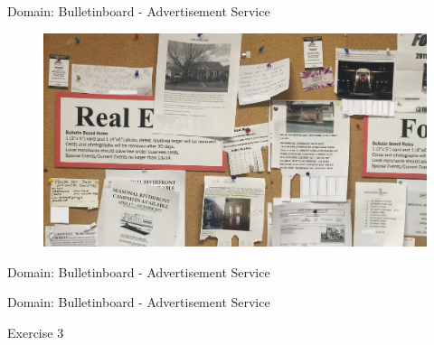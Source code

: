 \begin{frame}{Domain: Bulletinboard - Advertisement Service}
 \begin{figure}
    \includegraphics[width=\textwidth]{../CreateMicroservice//images/Bulletinboard}
  \end{figure}
\end{frame}

\begin{frame}{Domain: Bulletinboard - Advertisement Service}
\begin{figure}
\end{figure}
\end{frame}

\begin{frame}{Domain: Bulletinboard - Advertisement Service}
\begin{figure}
\end{figure}
\end{frame}


\begin{frame}{Exercise 3}
	\begin{figure}
	\end{figure}
\end{frame}


